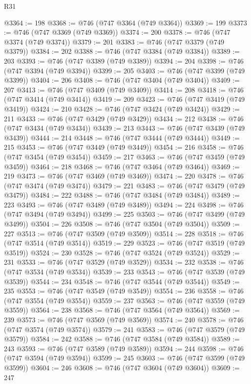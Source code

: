 \begin{lexlean}{R31}
\begin{coremodule}
@3364 := 198
@3368 := @746 (@747 @3364 (@749 @3364))
@3369 := 199
@3373 := @746 (@747 @3369 (@749 @3369))
@3374 := 200
@3378 := @746 (@747 @3374 (@749 @3374))
@3379 := 201
@3383 := @746 (@747 @3379 (@749 @3379))
@3384 := 202
@3388 := @746 (@747 @3384 (@749 @3384))
@3389 := 203
@3393 := @746 (@747 @3389 (@749 @3389))
@3394 := 204
@3398 := @746 (@747 @3394 (@749 @3394))
@3399 := 205
@3403 := @746 (@747 @3399 (@749 @3399))
@3404 := 206
@3408 := @746 (@747 @3404 (@749 @3404))
@3409 := 207
@3413 := @746 (@747 @3409 (@749 @3409))
@3414 := 208
@3418 := @746 (@747 @3414 (@749 @3414))
@3419 := 209
@3423 := @746 (@747 @3419 (@749 @3419))
@3424 := 210
@3428 := @746 (@747 @3424 (@749 @3424))
@3429 := 211
@3433 := @746 (@747 @3429 (@749 @3429))
@3434 := 212
@3438 := @746 (@747 @3434 (@749 @3434))
@3439 := 213
@3443 := @746 (@747 @3439 (@749 @3439))
@3444 := 214
@3448 := @746 (@747 @3444 (@749 @3444))
@3449 := 215
@3453 := @746 (@747 @3449 (@749 @3449))
@3454 := 216
@3458 := @746 (@747 @3454 (@749 @3454))
@3459 := 217
@3463 := @746 (@747 @3459 (@749 @3459))
@3464 := 218
@3468 := @746 (@747 @3464 (@749 @3464))
@3469 := 219
@3473 := @746 (@747 @3469 (@749 @3469))
@3474 := 220
@3478 := @746 (@747 @3474 (@749 @3474))
@3479 := 221
@3483 := @746 (@747 @3479 (@749 @3479))
@3484 := 222
@3488 := @746 (@747 @3484 (@749 @3484))
@3489 := 223
@3493 := @746 (@747 @3489 (@749 @3489))
@3494 := 224
@3498 := @746 (@747 @3494 (@749 @3494))
@3499 := 225
@3503 := @746 (@747 @3499 (@749 @3499))
@3504 := 226
@3508 := @746 (@747 @3504 (@749 @3504))
@3509 := 227
@3513 := @746 (@747 @3509 (@749 @3509))
@3514 := 228
@3518 := @746 (@747 @3514 (@749 @3514))
@3519 := 229
@3523 := @746 (@747 @3519 (@749 @3519))
@3524 := 230
@3528 := @746 (@747 @3524 (@749 @3524))
@3529 := 231
@3533 := @746 (@747 @3529 (@749 @3529))
@3534 := 232
@3538 := @746 (@747 @3534 (@749 @3534))
@3539 := 233
@3543 := @746 (@747 @3539 (@749 @3539))
@3544 := 234
@3548 := @746 (@747 @3544 (@749 @3544))
@3549 := 235
@3553 := @746 (@747 @3549 (@749 @3549))
@3554 := 236
@3558 := @746 (@747 @3554 (@749 @3554))
@3559 := 237
@3563 := @746 (@747 @3559 (@749 @3559))
@3564 := 238
@3568 := @746 (@747 @3564 (@749 @3564))
@3569 := 239
@3573 := @746 (@747 @3569 (@749 @3569))
@3574 := 240
@3578 := @746 (@747 @3574 (@749 @3574))
@3579 := 241
@3583 := @746 (@747 @3579 (@749 @3579))
@3584 := 242
@3588 := @746 (@747 @3584 (@749 @3584))
@3589 := 243
@3593 := @746 (@747 @3589 (@749 @3589))
@3594 := 244
@3598 := @746 (@747 @3594 (@749 @3594))
@3599 := 245
@3603 := @746 (@747 @3599 (@749 @3599))
@3604 := 246
@3608 := @746 (@747 @3604 (@749 @3604))
@3609 := 247

\end{coremodule}
\end{lexlean}
